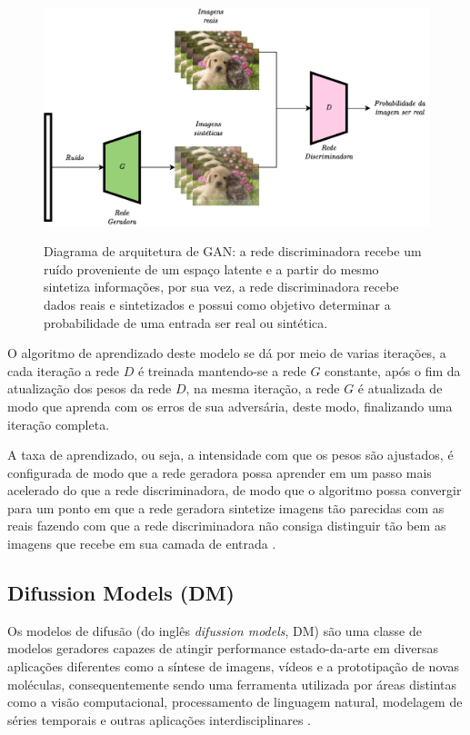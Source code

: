 \begin{figure}[htbp]
	\centering
	\caption{Diagrama de arquitetura de GAN: a rede discriminadora recebe um ruído proveniente de um espaço latente e a partir do mesmo sintetiza informações, por sua vez, a rede discriminadora recebe dados reais e sintetizados e possui como objetivo determinar a probabilidade de uma entrada ser real ou sintética.}
		\includegraphics[scale=.25]{imagens/gan.png}
	\label{fig:gan}
\end{figure}

O algoritmo de aprendizado deste modelo se dá por meio de varias iterações, a cada iteração a rede $D$ é treinada mantendo-se a rede $G$ constante, após o fim da atualização dos pesos da rede $D$, na mesma iteração, a rede $G$ é atualizada de modo que aprenda com os erros de sua adversária, deste modo, finalizando uma iteração completa.

A taxa de aprendizado, ou seja, a intensidade com que os pesos são ajustados, é configurada de modo que a rede geradora possa aprender em um passo mais acelerado do que a rede discriminadora, de modo que o algoritmo possa convergir para um ponto em que a rede geradora sintetize imagens tão parecidas com as reais fazendo com que a rede discriminadora não consiga distinguir tão bem as imagens que recebe em sua camada de entrada \cite{goodfellowGenerativeAdversarialNetworks2014}.

\subsection{Difussion Models (DM)}

Os modelos de difusão (do inglês \textit{difussion models}, DM) são uma classe de modelos geradores capazes de atingir performance estado-da-arte em diversas aplicações diferentes como a síntese de imagens, vídeos e a prototipação de novas moléculas, consequentemente sendo uma ferramenta utilizada por áreas distintas como a visão computacional, processamento de linguagem natural, modelagem de séries temporais e outras aplicações interdisciplinares \cite{yangDiffusionModelsComprehensive2023}.

